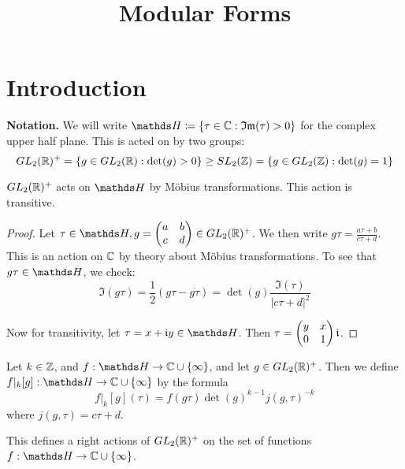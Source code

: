 \documentclass[10pt,a4paper]{article}
\title{Modular Forms}
\begin{document}
\maketitle
\tableofcontents
\newpage
\setcounter{section}{-1}
\section{Introduction}
\textbf{Notation.} We will write $\H \coloneqq \{\tau \in \C: \Im(\tau) > 0\}$ for the complex upper half plane. This is acted on by two groups: \[GL_2(\mathbb{R})^+ = \{g \in GL_2(\mathbb{R}): \det(g) > 0\} \geq SL_2(\mathbb{Z}) = \{g \in GL_2(\mathbb{Z}) : \det(g)=1\}\]
\begin{lemma}
  $GL_2(\mathbb{R})^+$ acts on $\H$ by M\"obius transformations. This action is transitive.
\end{lemma}
\begin{proof}
  Let $\tau \in \H, g = \begin{pmatrix} a&b\\c&d\end{pmatrix} \in GL_2(\R)^+$. We then write $g\tau = \frac{a\tau+b}{c\tau+d}$. This is an action on $\mathbb{C}$ by theory about M\"obius transformations. To see that $g\tau \in \H$, we check:
  \[\Im(g\tau) = \frac{1}{2}(g\tau - \overline{g\tau}) = \det(g) \frac{\Im(\tau)}{|c\tau+d|^2}\]

  Now for transitivity, let $\tau = x+\im y \in \H$. Then $\tau = \begin{pmatrix}y&x\\0&1\end{pmatrix}\mathfrak{i}$.
\end{proof}
\begin{definition}
  Let $k \in \mathbb{Z}$, and $f : \H \to \C\cup\{\infty\}$, and let $g \in GL_2(\mathbb{R})^+$. Then we define $f|_k[g]:\H \to \C\cup\{\infty\}$ by the formula
  \[f|_k[g](\tau) = f(g\tau)\det(g)^{k-1}j(g, \tau)^{-k}\]
  where $j(g, \tau) = c\tau+d$.
\end{definition}
\begin{lemma}
  This defines a right actions of $GL_2(\mathbb{R})^+$ on the set of functions $f:\H \to \C\cup\{\infty\}$.
\end{lemma}
\end{document}
